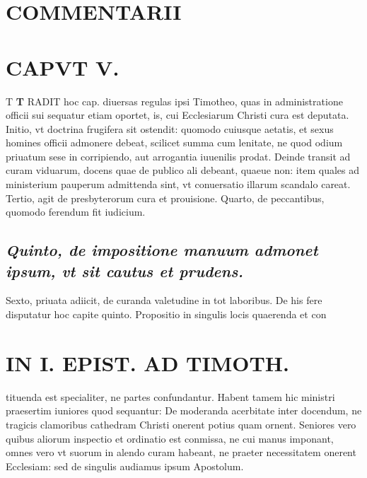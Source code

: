 \documentclass{article}
\begin{document}
\begin{pages}
\section*{COMMENTARII }
\marginpar{[ p.116 ]}
\endnumbering\beginnumbering\section{CAPVT V.}T \pstart \textbf{T} RADIT hoc cap. diuersas regulas ipsi Timotheo, quas in administratione officii sui sequatur etiam oportet, is, cui Ecclesiarum Christi cura est deputata. Initio, vt doctrina frugifera sit ostendit: quomodo cuiusque aetatis, et sexus homines officii admonere debeat, scilicet summa cum lenitate, ne quod odium priuatum sese in corripiendo, aut arrogantia iuuenilis prodat.  \pend\pstart Deinde transit ad curam viduarum, docens quae de publico ali debeant, quaeue non: item quales ad ministerium pauperum admittenda sint, vt conuersatio illarum scandalo careat.  \pend\pstart Tertio, agit de presbyterorum cura et prouisione.  \pend\pstart Quarto, de peccantibus, quomodo ferendum fit iudicium.  \pend
{}
{}
\subsection*{\textit{Quinto, de impositione manuum admonet ipsum, vt sit cautus et prudens. }}\pstart Sexto, priuata adiicit, de curanda valetudine in tot laboribus. De his fere disputatur hoc capite quinto.  \pend\pstart Propositio in singulis locis quaerenda et con  \pend
\section*{IN I. EPIST. AD TIMOTH. }
\marginpar{[ p.117 ]}\pstart tituenda est specialiter, ne partes confundantur. Habent tamem hic ministri praesertim iuniores quod sequantur: De moderanda acerbitate inter docendum, ne tragicis clamoribus  cathedram Christi onerent potius quam ornent. Seniores vero quibus aliorum inspectio et ordinatio est conmissa, ne cui manus imponant, omnes vero vt suorum in alendo curam habeant, ne praeter necessitatem onerent Ecclesiam: sed de singulis audiamus ipsum Apostolum.  \pend
{}
{}

\end{pages}
\end{document}
